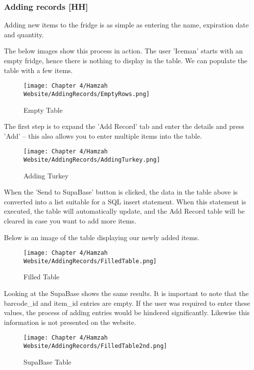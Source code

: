 \subsubsection{Adding records [HH]}

Adding new items to the fridge is as simple as entering the name, expiration date and quantity.

The below images show this process in action.
The user 'Iceman' starts with an empty fridge, hence there is nothing to display in the table.
We can populate the table with a few items.

\begin{figure}[H]        
    \centering
    \texttt{[image: Chapter 4/Hamzah Website/AddingRecords/EmptyRows.png]}
    \caption{Empty Table}
    \label{fig:empty}
\end{figure} 

The first step is to expand the 'Add Record' tab and enter the details and press 'Add' – this also allows you to enter multiple items into the table.

\begin{figure}[H]        
    \centering
    \texttt{[image: Chapter 4/Hamzah Website/AddingRecords/AddingTurkey.png]}
    \caption{Adding Turkey}
    \label{fig:addturk}
\end{figure} 

When the 'Send to SupaBase' button is clicked,  the data in the table above is converted into a list suitable for a SQL insert statement.
When this statement is executed, the table will automatically update, and the Add Record table will be cleared in case you want to add more items.

Below is an image of the table displaying our newly added items.

\begin{figure}[H]        
    \centering
    \texttt{[image: Chapter 4/Hamzah Website/AddingRecords/FilledTable.png]}
    \caption{Filled Table}
    \label{fig:websitetable}
\end{figure} 

Looking at the SupaBase shows the same results.
It is important to note that the barcode\_id and item\_id entries are empty.
If the user was required to enter these values, the process of adding entries would be hindered significantly.
Likewise this information is not presented on the website.

\begin{figure}[H]        
    \centering
    \texttt{[image: Chapter 4/Hamzah Website/AddingRecords/FilledTable2nd.png]}
    \caption{SupaBase Table}
    \label{fig:subapasetable}
\end{figure} 

